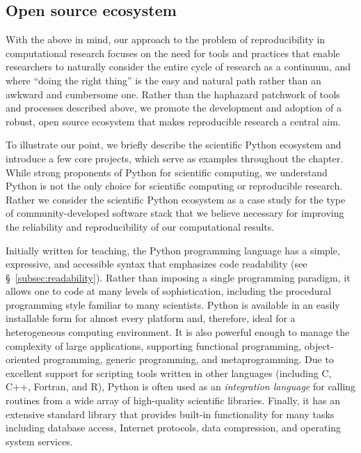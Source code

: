 \documentclass[11pt,oneside,english]{article}
\begin{document}
\subsection{Open source ecosystem}

With the above in mind, our approach to the problem of reproducibility in
computational research focuses on the need for tools and practices that enable
researchers to naturally consider the entire cycle of research as a continuum,
and where ``doing the right thing'' is the easy and natural path rather than an
awkward and cumbersome one.  Rather than the haphazard patchwork of tools and
processes described above, we promote the development and adoption of a robust,
open source ecosystem that makes reproducible research a central aim.

To illustrate our point, we briefly describe the scientific Python ecosystem
\cite{oliphant2007python,millman2011python,Perez2011} and introduce a few
core projects, which serve as examples throughout the chapter.  While
strong proponents of Python for scientific computing, we understand Python is
not the only choice for scientific computing or reproducible research.  Rather
we consider the scientific Python ecosystem as a case study for the type of
community-developed software stack that we believe necessary for improving the
reliability and reproducibility of our computational results. 

Initially written for teaching, the Python programming language has a simple,
expressive, and accessible syntax that emphasizes code readability (see
§~\ref{subsec:readability}).  Rather than imposing a single programming
paradigm, it allows one to code at many levels of sophistication, including the
procedural programming style familiar to many scientists. Python is available
in an easily installable form for almost every platform and, therefore, ideal
for a heterogeneous computing environment. It is also powerful enough to manage
the complexity of large applications, supporting functional programming,
object-oriented programming, generic programming, and metaprogramming.  Due to
excellent support for scripting tools written in other languages (including C,
C++, Fortran, and R), Python is often used as an \emph{integration language} for
calling routines from a wide array of high-quality scientific libraries.
Finally, it has an extensive standard library that provides built-in
functionality for many tasks including database access, Internet protocols,
data compression, and operating system services.
\end{document}

